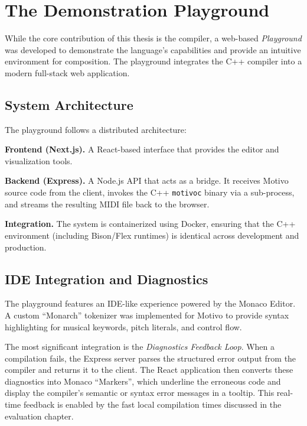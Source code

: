 

\section{The Demonstration Playground}\label{detail-sec:implementation-playground}

While the core contribution of this thesis is the compiler, a web-based \textit{Playground} was developed to demonstrate
the language's capabilities and provide an intuitive environment for composition.
The playground integrates the C++ compiler into a modern full-stack web application.

\subsection{System Architecture}\label{detail-subsec:system-architecture}

The playground follows a distributed architecture:

\noindent \textbf{Frontend (Next.js).} A React-based interface that provides the editor and visualization tools.

\noindent \textbf{Backend (Express).} A Node.js API that acts as a bridge.
It receives Motivo source code from the client, invokes the C++ \texttt{motivoc} binary via a sub-process, and streams
the resulting MIDI file back to the browser.

\noindent \textbf{Integration.} The system is containerized using Docker, ensuring that the C++ environment (including
Bison/Flex runtimes) is identical across development and production.

\subsection{IDE Integration and Diagnostics}\label{detail-subsec:ide-integration-and-diagnostics}

The playground features an IDE-like experience powered by the Monaco Editor.
A custom ``Monarch'' tokenizer was implemented for Motivo to provide syntax highlighting for musical keywords, pitch
literals, and control flow.

The most significant integration is the \textit{Diagnostics Feedback Loop}.
When a compilation fails, the Express server parses the structured error output from the compiler and returns it to the
client.
The React application then converts these diagnostics into Monaco ``Markers'', which underline the erroneous code and
display the compiler's semantic or syntax error messages in a tooltip.
This real-time feedback is enabled by the fast local compilation times discussed in the evaluation chapter.

